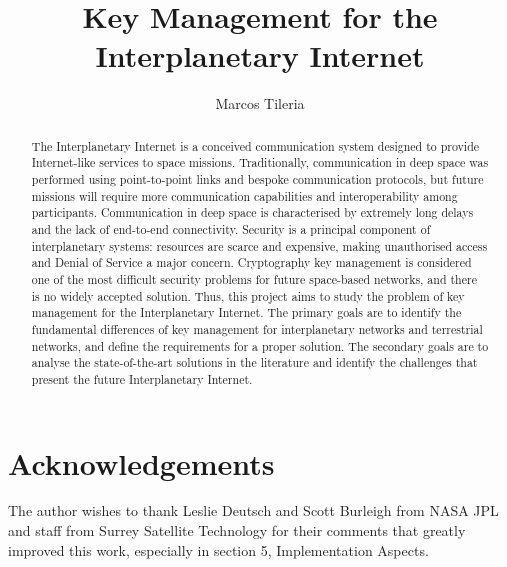 \documentclass[11pt]{article} %
\title{Key Management for the Interplanetary Internet}
\author{Marcos Tileria}
\theoremstyle{plain}
\theoremstyle{definition}
\begin{document}
\maketitle




\begin{abstract}

  
The Interplanetary Internet is a conceived communication system designed to provide Internet-like services to space missions. Traditionally, communication in deep space was performed using point-to-point links and bespoke communication protocols, but future missions will require more communication capabilities and interoperability among participants. Communication in deep space is characterised by extremely long delays and the lack of end-to-end connectivity. Security is a principal component of interplanetary systems: resources are scarce and expensive, making unauthorised access and Denial of Service a major concern. Cryptography key management is considered one of the most difficult security problems for future space-based networks, and there is no widely accepted solution. Thus, this project aims to study the problem of key management for the Interplanetary Internet. The primary goals are to identify the fundamental differences of key management for interplanetary networks and terrestrial networks, and define the requirements for a proper solution. The secondary goals are to analyse the state-of-the-art solutions in the literature and identify the challenges that present the future Interplanetary Internet.  

  
\end{abstract}




 \newpage


 \newpage


\newpage


\newpage





\section{Acknowledgements}

The author wishes to thank Leslie Deutsch and Scott Burleigh from NASA JPL and staff from Surrey Satellite Technology for their comments that greatly improved this work, especially in section 5, Implementation Aspects.   



\clearpage
 
\printglossary[type=\acronymtype]


\end{document}
